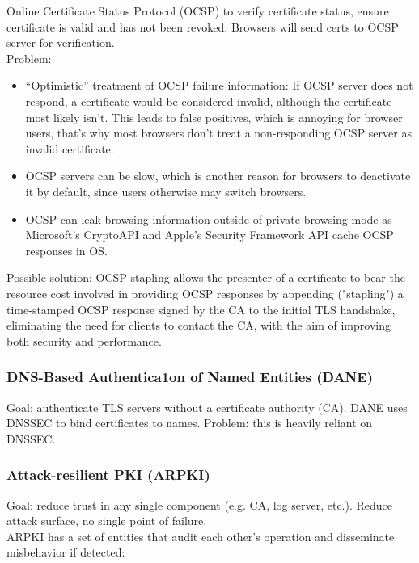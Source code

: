 \documentclass[11pt,oneside,a4paper]{article}
\begin{document}
Online Certificate Status Protocol (OCSP) to verify certificate status, ensure certificate is valid and has not been revoked. Browsers will send certs to OCSP server for verification.\\
Problem: 
\vspace{-\topsep}
\begin{itemize}
	\setlength{\itemsep}{0pt}
	\setlength{\parskip}{0pt}
	\item “Optimistic” treatment of OCSP failure information: If OCSP server does not respond, a certificate would be considered invalid, although the certificate most likely isn't. This leads to false positives, which is annoying for browser users, that's why most browsers don't treat a non-responding OCSP server as invalid certificate.
	\item OCSP servers can be slow, which is another reason for browsers to deactivate it by default, since users otherwise may switch browsers.
	\item OCSP can leak browsing information outside of private browsing mode as Microsoft’s CryptoAPI and Apple’s Security Framework API cache OCSP responses in OS.
\end{itemize}
\vspace{-\topsep} 

Possible solution: OCSP stapling allows the presenter of a certificate to bear the resource cost involved in providing OCSP responses by appending ("stapling") a time-stamped OCSP response signed by the CA to the initial TLS handshake, eliminating the need for clients to contact the CA, with the aim of improving both security and performance.

\subsubsection{DNS-Based Authentica1on of Named Entities (DANE)}

Goal: authenticate TLS servers without a certificate authority (CA). DANE uses DNSSEC to bind certificates to names. Problem: this is heavily reliant on DNSSEC.

\subsubsection{Attack-resilient PKI (ARPKI)}

Goal: reduce trust in any single component (e.g. CA, log server, etc.). Reduce attack surface, no single point of failure.\\
ARPKI has a set of entities that audit each other's operation and disseminate misbehavior if detected:
\end{document}
